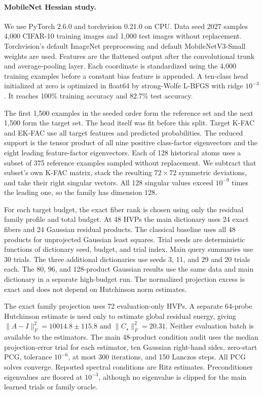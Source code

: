 \documentclass{article}
\theoremstyle{remark}
\newcommand{\1}{\mathbf 1}
\begin{document}
\paragraph{MobileNet Hessian study.}
We use PyTorch 2.6.0 and torchvision 0.21.0 on CPU.  Data seed 2027 samples 4,000 CIFAR-10 training images and 1,000 test images without replacement. Torchvision's default ImageNet preprocessing and default MobileNetV3-Small weights are used.  Features are the flattened output after the convolutional trunk and average-pooling layer.  Each coordinate is standardized using the 4,000 training examples before a constant bias feature is appended.  A ten-class head initialized at zero is optimized in float64 by strong-Wolfe L-BFGS with ridge $10^{-3}$.  It reaches 100\% training accuracy and 82.7\% test accuracy.

The first 1,500 examples in the seeded order form the reference set and the next 1,500 form the target set.  The head itself was fit before this split. Target K-FAC and EK-FAC use all target features and predicted probabilities. The reduced support is the tensor product of all nine positive class-factor eigenvectors and the eight leading feature-factor eigenvectors.  Each of 128 historical atoms uses a subset of 375 reference examples sampled without replacement.  We subtract that subset's own K-FAC matrix, stack the resulting $72\times72$ symmetric deviations, and take their right singular vectors.  All 128 singular values exceed $10^{-9}$ times the leading one, so the family has dimension 128.

For each target budget, the exact fiber rank is chosen using only the residual family profile and total budget.  At 48 HVPs the main dictionary uses 24 exact fibers and 24 Gaussian residual products.  The classical baseline uses all 48 products for unprojected Gaussian least squares.  Trial seeds are deterministic functions of dictionary seed, budget, and trial index.  Main query summaries use 30 trials.  The three additional dictionaries use seeds 3, 11, and 29 and 20 trials each.  The 80, 96, and 128-product Gaussian results use the same data and main dictionary in a separate high-budget run.  The normalized projection excess is exact and does not depend on Hutchinson norm estimates.

The exact family projection uses 72 evaluation-only HVPs.  A separate 64-probe Hutchinson estimate is used only to estimate global residual energy, giving $\|A-I\|_F^2=10014.8\pm115.8$ and $\|C_\star\|_F^2=20.31$.  Neither evaluation batch is available to the estimators.  The main 48-product condition audit uses the median projection-error trial for each estimator, ten Gaussian right-hand sides, zero-start PCG, tolerance $10^{-6}$, at most 300 iterations, and 150 Lanczos steps.  All PCG solves converge.  Reported spectral conditions are Ritz estimates.  Preconditioner eigenvalues are floored at $10^{-3}$, although no eigenvalue is clipped for the main learned trials or family oracle.
\end{document}
